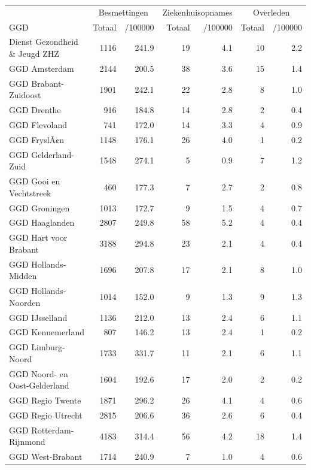 \documentclass[
  english,
  man,floatsintext]{apa6}
\begin{document}
\begin{table}
\centering\begingroup\fontsize{10}{12}\selectfont

\begin{threeparttable}
\begin{tabular}{lrrrrrr}
\toprule
\multicolumn{1}{c}{ } & \multicolumn{2}{c}{Besmettingen} & \multicolumn{2}{c}{Ziekenhuisopnames} & \multicolumn{2}{c}{Overleden} \\
\cmidrule(l{3pt}r{3pt}){2-3} \cmidrule(l{3pt}r{3pt}){4-5} \cmidrule(l{3pt}r{3pt}){6-7}
GGD & Totaal & /100000 & Totaal & /100000 & Totaal & /100000\\
\midrule
Dienst Gezondheid \& Jeugd ZHZ & 1116 & 241.9 & 19 & 4.1 & 10 & 2.2\\
GGD Amsterdam & 2144 & 200.5 & 38 & 3.6 & 15 & 1.4\\
GGD Brabant-Zuidoost & 1901 & 242.1 & 22 & 2.8 & 8 & 1.0\\
GGD Drenthe & 916 & 184.8 & 14 & 2.8 & 2 & 0.4\\
GGD Flevoland & 741 & 172.0 & 14 & 3.3 & 4 & 0.9\\
GGD FryslÃ¢n & 1148 & 176.1 & 26 & 4.0 & 1 & 0.2\\
GGD Gelderland-Zuid & 1548 & 274.1 & 5 & 0.9 & 7 & 1.2\\
GGD Gooi en Vechtstreek & 460 & 177.3 & 7 & 2.7 & 2 & 0.8\\
GGD Groningen & 1013 & 172.7 & 9 & 1.5 & 4 & 0.7\\
GGD Haaglanden & 2807 & 249.8 & 58 & 5.2 & 4 & 0.4\\
GGD Hart voor Brabant & 3188 & 294.8 & 23 & 2.1 & 4 & 0.4\\
GGD Hollands-Midden & 1696 & 207.8 & 17 & 2.1 & 8 & 1.0\\
GGD Hollands-Noorden & 1014 & 152.0 & 9 & 1.3 & 9 & 1.3\\
GGD IJsselland & 1136 & 212.0 & 13 & 2.4 & 6 & 1.1\\
GGD Kennemerland & 807 & 146.2 & 13 & 2.4 & 1 & 0.2\\
GGD Limburg-Noord & 1733 & 331.7 & 11 & 2.1 & 6 & 1.1\\
GGD Noord- en Oost-Gelderland & 1604 & 192.6 & 17 & 2.0 & 2 & 0.2\\
GGD Regio Twente & 1871 & 296.2 & 26 & 4.1 & 4 & 0.6\\
GGD Regio Utrecht & 2815 & 206.6 & 36 & 2.6 & 6 & 0.4\\
GGD Rotterdam-Rijnmond & 4183 & 314.4 & 56 & 4.2 & 18 & 1.4\\
GGD West-Brabant & 1714 & 240.9 & 7 & 1.0 & 4 & 0.6\\

\end{tabular}
\end{threeparttable}
\end{table}
\end{document}

